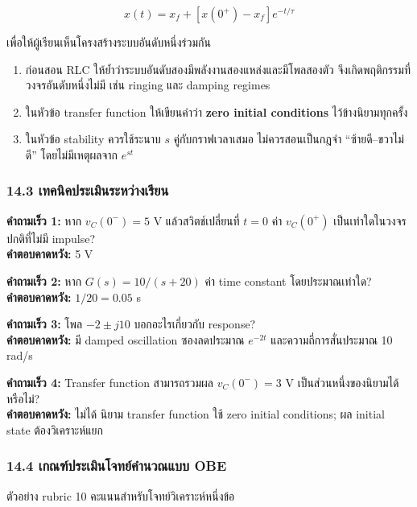 \[
\boxed{x(t)=x_f+[x(0^+)-x_f]e^{-t/\tau}}
\]

เพื่อให้ผู้เรียนเห็นโครงสร้างระบบอันดับหนึ่งร่วมกัน

\begin{enumerate}
    \item ก่อนสอน RLC ให้ย้ำว่าระบบอันดับสองมีพลังงานสองแหล่งและมีโพลสองตัว จึงเกิดพฤติกรรมที่วงจรอันดับหนึ่งไม่มี เช่น ringing และ damping regimes
    \item ในหัวข้อ transfer function ให้เขียนคำว่า \textbf{zero initial conditions} ไว้ข้างนิยามทุกครั้ง
    \item ในหัวข้อ stability ควรใช้ระนาบ $s$ คู่กับกราฟเวลาเสมอ ไม่ควรสอนเป็นกฎจำ “ซ้ายดี–ขวาไม่ดี” โดยไม่มีเหตุผลจาก $e^{st}$
\end{enumerate}

\subsubsection{14.3 เทคนิคประเมินระหว่างเรียน}

\textbf{คำถามเร็ว 1:} หาก $v_C(0^-)=5$ V แล้วสวิตช์เปลี่ยนที่ $t=0$ ค่า $v_C(0^+)$ เป็นเท่าใดในวงจรปกติที่ไม่มี impulse?\\
\textbf{คำตอบคาดหวัง:} 5 V

\textbf{คำถามเร็ว 2:} หาก $G(s)=10/(s+20)$ ค่า time constant โดยประมาณเท่าใด?\\
\textbf{คำตอบคาดหวัง:} $1/20=0.05$ s

\textbf{คำถามเร็ว 3:} โพล $-2\pm j10$ บอกอะไรเกี่ยวกับ response?\\
\textbf{คำตอบคาดหวัง:} มี damped oscillation ซองลดประมาณ $e^{-2t}$ และความถี่การสั่นประมาณ 10 rad/s

\textbf{คำถามเร็ว 4:} Transfer function สามารถรวมผล $v_C(0^-)=3$ V เป็นส่วนหนึ่งของนิยามได้หรือไม่?\\
\textbf{คำตอบคาดหวัง:} ไม่ได้ นิยาม transfer function ใช้ zero initial conditions; ผล initial state ต้องวิเคราะห์แยก

\subsubsection{14.4 เกณฑ์ประเมินโจทย์คำนวณแบบ OBE}

ตัวอย่าง rubric 10 คะแนนสำหรับโจทย์วิเคราะห์หนึ่งข้อ

